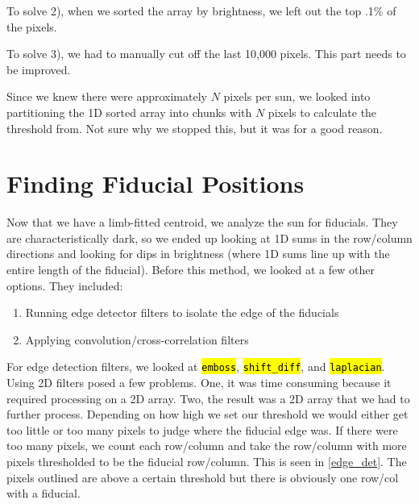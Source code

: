 \documentclass[10pt]{scrartcl}
\begin{document}
To solve 2), when we sorted the array by brightness, we left out the top .1\% of the pixels.

To solve 3), we had to manually cut off the last 10,000 pixels. This part needs to be improved.

Since we knew there were approximately $N$ pixels per sun, we looked into partitioning the 1D sorted array into chunks with $N$ pixels to calculate the threshold from. Not sure why we stopped this, but it was for a good reason.

\section{Finding Fiducial Positions} %
\label{sec:finding_fiducial_positions}

Now that we have a limb-fitted centroid, we analyze the sun for fiducials. They are characteristically dark, so we ended up looking at 1D sums in the row/column directions and looking for dips in brightness (where 1D sums line up with the entire length of the fiducial). Before this method, we looked at a few other options. They included:

\begin{enumerate}
    \item Running edge detector filters to isolate the edge of the fiducials
    \item Applying convolution/cross-correlation filters 
\end{enumerate}

For edge detection filters, we looked at \hl{\texttt{emboss}}, \hl{\texttt{shift\_diff}}, and \hl{\texttt{laplacian}}. Using 2D filters posed a few problems. One, it was time consuming because it required processing on a 2D array. Two, the result was a 2D array that we had to further process. Depending on how high we set our threshold we would either get too little or too many pixels to judge where the fiducial edge was. If there were too many pixels, we count each row/column and take the row/column with more pixels thresholded to be the fiducial row/column. This is seen in \cref{edge_det}. The pixels outlined are above a certain threshold  but there is obviously one row/col with a fiducial.\\
\end{document}
